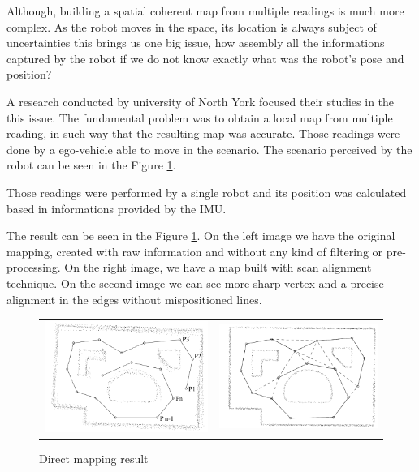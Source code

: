 Although, building a spatial coherent map from multiple readings is much more complex. As the robot moves in the space, its location is always subject of uncertainties this brings us one big issue, how assembly all the informations captured by the robot if we do not know exactly what was the robot's pose and position? 

A research conducted by university of North York\cite{Lu:1997:GCR:591441.591464} focused their studies in the this issue. The fundamental problem was to obtain a local map from multiple reading, in such way that the resulting map was accurate. Those readings were done by a ego-vehicle able to move in the scenario. The scenario perceived by the robot can be seen in the Figure \ref{fig:mapping:direct:result}.

Those readings were performed by a single robot and its position was calculated based in informations provided by the IMU.

The result can be seen in the Figure \ref{fig:mapping:direct:result}. On the left image we have the original mapping, created with raw information and without any kind of filtering or pre-processing. On the right image, we have a map built with scan alignment technique\cite{Lu:1997:GCR:591441.591464}. On the second image we can see more sharp vertex and a precise alignment in the edges without mispositioned lines.

\begin{figure}[h]
\centering
	\begin{tabular}{lr}\\
		\includegraphics[width=0.5\columnwidth]{img/fig:mapping:direct:a} &
		\includegraphics[width=0.5\columnwidth]{img/fig:mapping:direct:b}
	\end{tabular}
	\caption{Direct mapping result}
	\label{fig:mapping:direct:result}
\end{figure}

